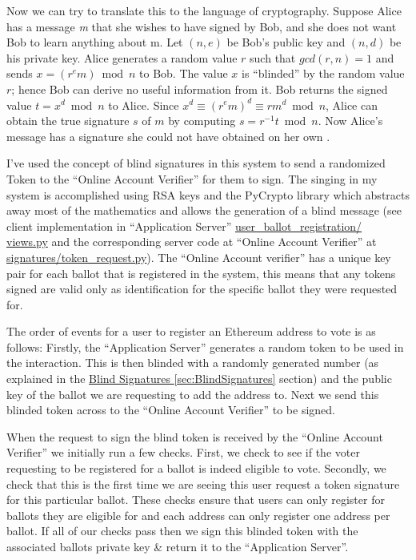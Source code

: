 \documentclass{article}
\begin{document}
\begin{adjustwidth}{0.5cm}{}
	Now we can try to translate this to the language of cryptography. Suppose Alice has a message \textit{m} that she wishes to have signed by Bob, and she does not want Bob to learn anything about m. Let \((n,e)\) be Bob's public key and \((n,d)\) be his private key. Alice generates a random value \(r\) such that \(gcd(r, n) = 1\) and sends \(x = (r^e m) \bmod n\) to Bob. The value \(x\) is ``blinded'' by the random value \(r\); hence Bob can derive no useful information from it. Bob returns the signed value \(t = x^d \bmod n\) to Alice. Since \(x^d \equiv (r^e m)^d \equiv rm^d \bmod n\), Alice can obtain the true signature \(s\) of \(m\) by computing \(s = r^{-1} t \bmod n\). Now Alice's message has a signature she could not have obtained on her own \citep{65_bellovin_2015}.
\end{adjustwidth}

I've used the concept of blind signatures in this system to send a randomized Token to the ``Online Account Verifier'' for them to sign. The singing in my system is accomplished using RSA keys and the PyCrypto library \citep{66_pycrypto_the_python_cryptography_toolkit_2017} which abstracts away most of the mathematics and allows the generation of a blind message (see client implementation in ``Application Server'' \href{https://github.com/Mattie432/Blockchain-Voting-System/blob/master/Programming/2_ApplicationServer/user_ballot_registration/views.py#L135}{user\_ballot\_registration/\\views.py} and the corresponding server code at ``Online Account Verifier'' at \href{https://github.com/Mattie432/Blockchain-Voting-System/blob/master/Programming/3_OnlineAccountVerifier/signatures/token_request.py}{signatures/token\_request.py}). The ``Online Account verifier'' has a unique key pair for each ballot that is registered in the system, this means that any tokens signed are valid only as identification for the specific ballot they were requested for.

The order of events for a user to register an Ethereum address to vote is as follows: Firstly, the ``Application Server'' generates a random token to be used in the interaction. This is then blinded with a randomly generated number (as explained in the \hyperref[sec:BlindSignatures]{Blind Signatures \ref*{sec:BlindSignatures}} section) and the public key of the ballot we are requesting to add the address to. Next we send this blinded token across to the ``Online Account Verifier'' to be signed.

When the request to sign the blind token is received by the ``Online Account Verifier'' we initially run a few checks. First, we check to see if the voter requesting to be registered for a ballot is indeed eligible to vote. Secondly, we check that this is the first time we are seeing this user request a token signature for this particular ballot. These checks ensure that users can only register for ballots they are eligible for and each address can only register one address per ballot. If all of our checks pass then we sign this blinded token with the associated ballots private key \& return it to the ``Application Server''.
\end{document}
